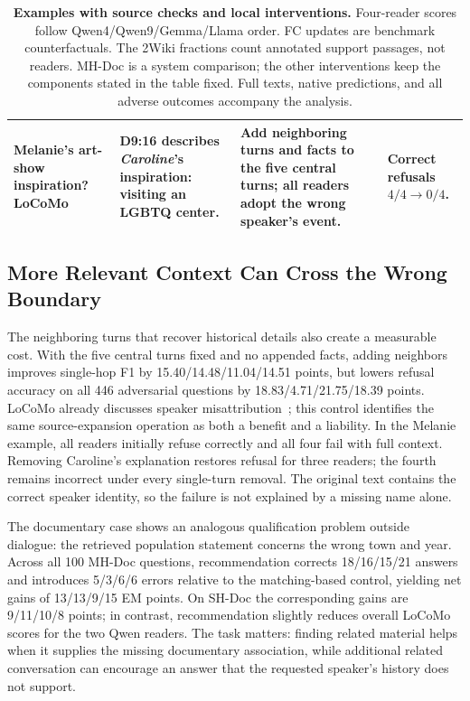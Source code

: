 \begin{table}[t]
\begin{tabular}{p{}p{}p{}p{}}
\addlinespace[3pt]
Melanie's art-show inspiration?\newline LoCoMo & D9:16 describes \emph{Caroline}'s inspiration: visiting an LGBTQ center. & Add neighboring turns and facts to the five central turns; all readers adopt the wrong speaker's event. & Correct refusals $4/4\to0/4$. \\
\bottomrule
\end{tabular}
\caption{\textbf{Examples with source checks and local interventions.} Four-reader scores follow Qwen4/Qwen9/Gemma/Llama order. FC updates are benchmark counterfactuals. The 2Wiki fractions count annotated support passages, not readers. MH-Doc is a system comparison; the other interventions keep the components stated in the table fixed. Full texts, native predictions, and all adverse outcomes accompany the analysis.}
\label{tab:memory-examples}
\end{table}

\subsection{More Relevant Context Can Cross the Wrong Boundary}
\label{sec:memory-boundaries}

The neighboring turns that recover historical details also create a measurable cost.
With the five central turns fixed and no appended facts, adding neighbors improves single-hop F1 by 15.40/14.48/11.04/14.51 points, but lowers refusal accuracy on all 446 adversarial questions by 18.83/4.71/21.75/18.39 points.
LoCoMo already discusses speaker misattribution~\citep{maharana-etal-2024-evaluating}; this control identifies the same source-expansion operation as both a benefit and a liability.
In the Melanie example, all readers initially refuse correctly and all four fail with full context.
Removing Caroline's explanation restores refusal for three readers; the fourth remains incorrect under every single-turn removal.
The original text contains the correct speaker identity, so the failure is not explained by a missing name alone.

The documentary case shows an analogous qualification problem outside dialogue: the retrieved population statement concerns the wrong town and year.
Across all 100 MH-Doc questions, recommendation corrects 18/16/15/21 answers and introduces 5/3/6/6 errors relative to the matching-based control, yielding net gains of 13/13/9/15 EM points.
On SH-Doc the corresponding gains are 9/11/10/8 points; in contrast, recommendation slightly reduces overall LoCoMo scores for the two Qwen readers.
The task matters: finding related material helps when it supplies the missing documentary association, while additional related conversation can encourage an answer that the requested speaker's history does not support.

